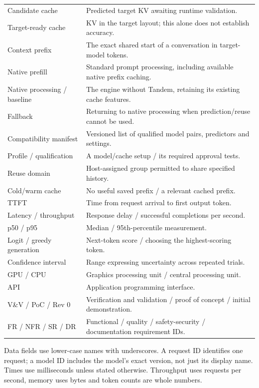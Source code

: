 \documentclass[12pt]{article}
\begin{document}
\begin{longtable}{@{}p{}p{}@{}}
Candidate cache & Predicted target KV awaiting runtime validation.\\
Target-ready cache & KV in the target layout; this alone does not establish accuracy.\\
Context prefix & The exact shared start of a conversation in target-model tokens.\\
Native prefill & Standard prompt processing, including available native prefix caching.\\
Native processing / baseline & The engine without Tandem, retaining its existing cache features.\\
Fallback & Returning to native processing when prediction/reuse cannot be used.\\
Compatibility manifest & Versioned list of qualified model pairs, predictors and settings.\\
Profile / qualification & A model/cache setup / its required approval tests.\\
Reuse domain & Host-assigned group permitted to share specified history.\\
Cold/warm cache & No useful saved prefix / a relevant cached prefix.\\
TTFT & Time from request arrival to first output token.\\
Latency / throughput & Response delay / successful completions per second.\\
p50 / p95 & Median / 95th-percentile measurement.\\
Logit / greedy generation & Next-token score / choosing the highest-scoring token.\\
Confidence interval & Range expressing uncertainty across repeated trials.\\
GPU / CPU & Graphics processing unit / central processing unit.\\
API & Application programming interface.\\
V\&V / PoC / Rev 0 & Verification and validation / proof of concept / initial demonstration.\\
FR / NFR / SR / DR & Functional / quality / safety-security / documentation requirement IDs.\\
\bottomrule
\end{longtable}
Data fields use lower-case names with underscores. A request ID identifies one
request; a model ID includes the model's exact version, not just its display
name. Times use milliseconds unless stated otherwise. Throughput uses requests
per second, memory uses bytes and token counts are whole numbers.
\end{document}
